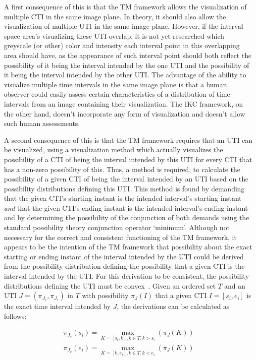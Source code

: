 A first consequence of this is that the TM framework allows the visualization of multiple CTI in the same image plane. In theory, it should also allow the visualization of multiple UTI in the same image plane. However, if the interval space area's visualizing these UTI overlap, it is not yet researched which greyscale (or other) color and intensity each interval point in this overlapping area should have, as the appearance of such interval point should both reflect the possibility of it being the interval intended by the one UTI and the possibility of it being the interval intended by the other UTI. The advantage of the ability to visualize multiple time intervals in the same image plane is that a human observer could easily assess certain characteristics of a distribution of time intervals from an image containing their visualization. The IKC framework, on the other hand, doesn't incorporate any form of visualization and doesn't allow such human assessments.

A second consequence of this is that the TM framework requires that an UTI can be visualized, using a visualization method which actually visualizes the possibility of a CTI of being the interval intended by this UTI for every CTI that has a non-zero possibility of this. Thus, a method is required, to calculate the possibility of a given CTI of being the interval intended by an UTI based on the possibility distributions defining this UTI. This method is found by demanding that the given CTI's starting instant is the intended interval's starting instant \emph{and} that the given CTI's ending instant is the intended interval's ending instant and by determining the possibility of the conjunction of both demands using the standard possibility theory conjunction operator `minimum'. Although not necessary for the correct and consistent functioning of the TM framework, it appears to be the intention of the TM framework that possibility about the exact starting or ending instant of the interval intended by the UTI could be derived from the possibility distribution defining the possibility that a given CTI is the interval intended by the UTI. For this derivation to be consistent, the possibility distributions defining the UTI must be convex~\cite{Dubois1983}. Given an ordered set $T$ and an UTI $J = (\pi_{J_s}, \pi_{J_e})$ in $T$ with possibility $\pi_J(I)$ that a given CTI $I = \left[s_i, e_i\right]$ is the exact time interval intended by $J$, the derivations can be calculated as follows:

\begin{align}
\pi_{J_s}(s_i) = \max_{K = \left[s_i, k\right], k \in T, k > s_i}(\pi_J(K)) \nonumber \\
\pi_{J_e}(e_i) = \max_{K = \left[k, e_i\right], k \in T, k < e_i}(\pi_J(K)) \nonumber
\end{align}

